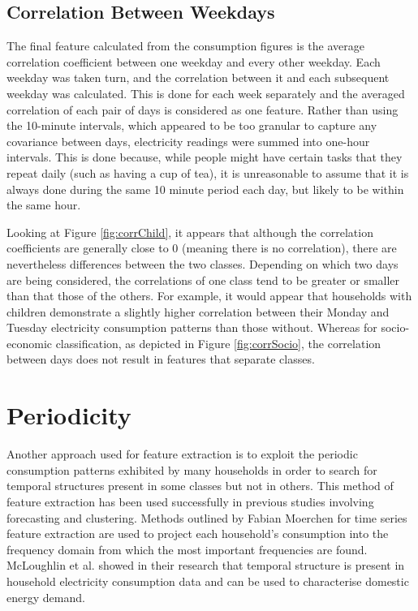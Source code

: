 \subsection*{Correlation Between Weekdays}

The final feature calculated from the consumption figures is the average correlation coefficient between one weekday and every other weekday.  Each weekday was taken turn, and the correlation between it and each subsequent weekday was calculated. This is done for each week separately and the averaged correlation of each pair of days is considered as one feature. Rather than using the 10-minute intervals, which appeared to be too granular to capture any covariance between days, electricity readings were summed into one-hour intervals. This is done because, while people might have certain tasks that they repeat daily (such as having a cup of tea), it is unreasonable to assume that it is always done during the same 10 minute period each day, but likely to be within the same hour.  



\corrChild %

Looking at Figure \ref{fig:corrChild}, it appears that although the correlation coefficients are generally close to 0 (meaning there is no correlation), there are nevertheless differences between the two classes. Depending on which two days are being considered, the correlations of one class tend to be greater or smaller than that those of the others. For example, it would appear that households with children demonstrate a slightly higher correlation between their Monday and Tuesday electricity consumption patterns than those without. Whereas for socio-economic classification, as depicted in Figure \ref{fig:corrSocio}, the correlation between days does not result in features that separate classes.

\corrSocio %


\section{Periodicity}

Another approach used for feature extraction is to exploit the periodic consumption patterns exhibited by many households in order to search for temporal structures present in some classes but not in others. This method of feature extraction has been used successfully in previous studies involving forecasting and clustering. Methods outlined by Fabian Moerchen \cite{Moerchen} for time series feature extraction are used to project each household's consumption into the frequency domain from which the most important frequencies are found. McLoughlin et al. \cite{McLoughlin} showed in their research that temporal structure is present in household electricity consumption data and can be used to characterise domestic energy demand.


